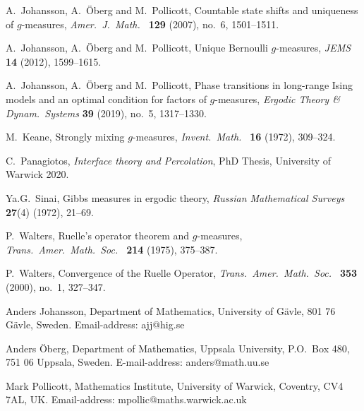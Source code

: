 \documentclass[11pt, a4paper]{amsart}
\theoremstyle{definition}
\theoremstyle{remark}
\begin{document}
\begin{thebibliography}{999}
 A.\ Johansson, A.\ \"Oberg and M.\ Pollicott,
  Countable state shifts and uniqueness of $g$-measures, {\em Amer.\
    J.\ Math.\ } {\bf 129} (2007), no.\ 6, 1501--1511.

 A.\ Johansson, A.\ \"Oberg and M.\ Pollicott, 
Unique Bernoulli $g$-measures, {\em JEMS} {\bf 14} (2012), 1599--1615.

 A.\ Johansson, A.\ \"Oberg and M.\ Pollicott, 
Phase transitions in long-range Ising models and an optimal 
condition for factors of $g$-measures, {\em Ergodic Theory \& Dynam.\ Systems}
{\bf 39} (2019), no.\ 5, 1317--1330.

  
 M.\ Keane, Strongly mixing $g$-measures, {\em Invent.\
    Math.\ } {\bf 16} (1972), 309--324.
    
C.\ Panagiotos, {\em Interface theory and Percolation}, PhD Thesis, University of Warwick 2020.    

\bibitem{sin}
Ya.G.\ Sinai, Gibbs measures in ergodic theory, {\em Russian Mathematical Surveys} {\bf 27}(4) (1972), 21--69. 

\bibitem{walters1}
P.\ Walters, Ruelle's operator theorem and $g$-measures, {\em Trans.\ Amer.\ Math.\ Soc.\ } {\bf 214} (1975), 375--387.

\bibitem{walters3}
P.\ Walters, Convergence of the Ruelle Operator, {\em Trans.\ Amer.\ Math.\ Soc.\ } {\bf 353} (2000), 
no.\ 1, 327--347.
\end{thebibliography}


\noindent
Anders Johansson, Department of Mathematics, University of G\"avle,
801 76 G\"avle, Sweden. Email-address: ajj@hig.se\newline

\noindent
Anders \"Oberg, Department of Mathematics, Uppsala University, P.O.\
Box 480, 751 06 Uppsala, Sweden. E-mail-address:
anders@math.uu.se\newline

\noindent
Mark Pollicott, Mathematics Institute, University of Warwick,
Coventry, CV4 7AL, UK. Email-address: mpollic@maths.warwick.ac.uk
\end{document}
